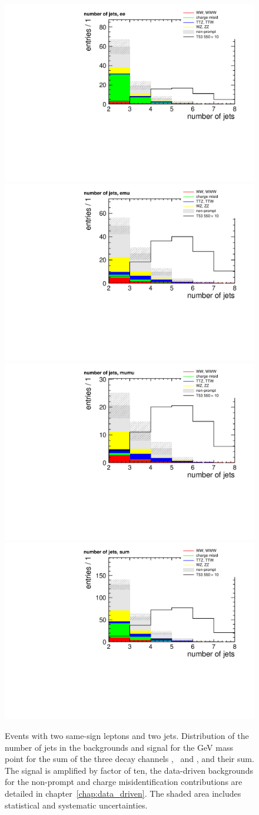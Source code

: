 \begin{figure}[htb]
    \centering
    \includegraphics[width=.49\textwidth]{images/pdf/n_jets_ee_0}
    \includegraphics[width=.49\textwidth]{images/pdf/n_jets_emu_0}\\
    \includegraphics[width=.49\textwidth]{images/pdf/n_jets_mumu_0}
    \includegraphics[width=.49\textwidth]{images/pdf/n_jets_sum_0}
    \caption{Events with two same-sign leptons and two jets. Distribution of the number of jets in the backgrounds and
        signal for the \unit[550]{GeV} mass point for the sum of the three
        decay channels \E\E, \E\M\ and \M\M, and their sum. The signal is
    amplified by factor of ten, the data-driven backgrounds for the
non-prompt and charge misidentification contributions are detailed in
chapter~\ref{chap:data_driven}. The shaded area includes statistical and
systematic uncertainties.}
    \label{fig:n_jets}
\end{figure}

